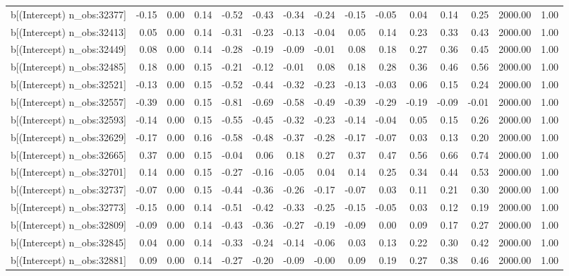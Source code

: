 \begin{table}[ht]
\begin{tabular}{rrrrrrrrrrrrrrr}
  b[(Intercept) n\_obs:32377] & -0.15 & 0.00 & 0.14 & -0.52 & -0.43 & -0.34 & -0.24 & -0.15 & -0.05 & 0.04 & 0.14 & 0.25 & 2000.00 & 1.00 \\ 
  b[(Intercept) n\_obs:32413] & 0.05 & 0.00 & 0.14 & -0.31 & -0.23 & -0.13 & -0.04 & 0.05 & 0.14 & 0.23 & 0.33 & 0.43 & 2000.00 & 1.00 \\ 
  b[(Intercept) n\_obs:32449] & 0.08 & 0.00 & 0.14 & -0.28 & -0.19 & -0.09 & -0.01 & 0.08 & 0.18 & 0.27 & 0.36 & 0.45 & 2000.00 & 1.00 \\ 
  b[(Intercept) n\_obs:32485] & 0.18 & 0.00 & 0.15 & -0.21 & -0.12 & -0.01 & 0.08 & 0.18 & 0.28 & 0.36 & 0.46 & 0.56 & 2000.00 & 1.00 \\ 
  b[(Intercept) n\_obs:32521] & -0.13 & 0.00 & 0.15 & -0.52 & -0.44 & -0.32 & -0.23 & -0.13 & -0.03 & 0.06 & 0.15 & 0.24 & 2000.00 & 1.00 \\ 
  b[(Intercept) n\_obs:32557] & -0.39 & 0.00 & 0.15 & -0.81 & -0.69 & -0.58 & -0.49 & -0.39 & -0.29 & -0.19 & -0.09 & -0.01 & 2000.00 & 1.00 \\ 
  b[(Intercept) n\_obs:32593] & -0.14 & 0.00 & 0.15 & -0.55 & -0.45 & -0.32 & -0.23 & -0.14 & -0.04 & 0.05 & 0.15 & 0.26 & 2000.00 & 1.00 \\ 
  b[(Intercept) n\_obs:32629] & -0.17 & 0.00 & 0.16 & -0.58 & -0.48 & -0.37 & -0.28 & -0.17 & -0.07 & 0.03 & 0.13 & 0.20 & 2000.00 & 1.00 \\ 
  b[(Intercept) n\_obs:32665] & 0.37 & 0.00 & 0.15 & -0.04 & 0.06 & 0.18 & 0.27 & 0.37 & 0.47 & 0.56 & 0.66 & 0.74 & 2000.00 & 1.00 \\ 
  b[(Intercept) n\_obs:32701] & 0.14 & 0.00 & 0.15 & -0.27 & -0.16 & -0.05 & 0.04 & 0.14 & 0.25 & 0.34 & 0.44 & 0.53 & 2000.00 & 1.00 \\ 
  b[(Intercept) n\_obs:32737] & -0.07 & 0.00 & 0.15 & -0.44 & -0.36 & -0.26 & -0.17 & -0.07 & 0.03 & 0.11 & 0.21 & 0.30 & 2000.00 & 1.00 \\ 
  b[(Intercept) n\_obs:32773] & -0.15 & 0.00 & 0.14 & -0.51 & -0.42 & -0.33 & -0.25 & -0.15 & -0.05 & 0.03 & 0.12 & 0.19 & 2000.00 & 1.00 \\ 
  b[(Intercept) n\_obs:32809] & -0.09 & 0.00 & 0.14 & -0.43 & -0.36 & -0.27 & -0.19 & -0.09 & 0.00 & 0.09 & 0.17 & 0.27 & 2000.00 & 1.00 \\ 
  b[(Intercept) n\_obs:32845] & 0.04 & 0.00 & 0.14 & -0.33 & -0.24 & -0.14 & -0.06 & 0.03 & 0.13 & 0.22 & 0.30 & 0.42 & 2000.00 & 1.00 \\ 
  b[(Intercept) n\_obs:32881] & 0.09 & 0.00 & 0.14 & -0.27 & -0.20 & -0.09 & -0.00 & 0.09 & 0.19 & 0.27 & 0.38 & 0.46 & 2000.00 & 1.00 \\ 

\end{tabular}
\end{table}

